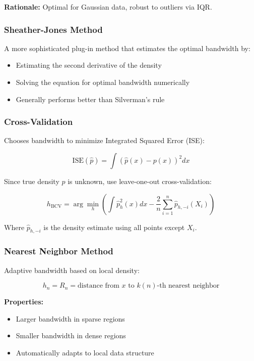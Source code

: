 \documentclass[12pt,a4paper]{article}
\begin{document}
\textbf{Rationale:} Optimal for Gaussian data, robust to outliers via IQR.

\subsubsection{Sheather-Jones Method}

A more sophisticated plug-in method that estimates the optimal bandwidth by:
\begin{itemize}
    \item Estimating the second derivative of the density
    \item Solving the equation for optimal bandwidth numerically
    \item Generally performs better than Silverman's rule
\end{itemize}

\subsubsection{Cross-Validation}

Chooses bandwidth to minimize Integrated Squared Error (ISE):

\begin{equation}
\text{ISE}(\hat{p}) = \int (\hat{p}(x) - p(x))^2 dx
\end{equation}

Since true density $p$ is unknown, use leave-one-out cross-validation:

\begin{equation}
h_{\text{BCV}} = \arg\min_h \left( \int \hat{p}_h^2(x) dx - \frac{2}{n} \sum_{i=1}^n \hat{p}_{h,-i}(X_i) \right)
\end{equation}

Where $\hat{p}_{h,-i}$ is the density estimate using all points except $X_i$.

\subsubsection{Nearest Neighbor Method}

Adaptive bandwidth based on local density:

\begin{equation}
h_n = R_n = \text{distance from } x \text{ to } k(n)\text{-th nearest neighbor}
\end{equation}

\textbf{Properties:}
\begin{itemize}
    \item Larger bandwidth in sparse regions
    \item Smaller bandwidth in dense regions  
    \item Automatically adapts to local data structure
\end{itemize}
\end{document}
